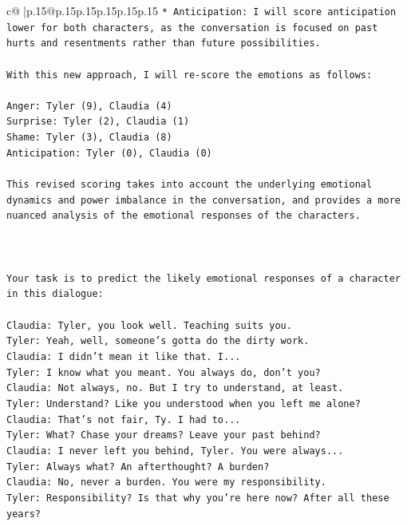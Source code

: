 \documentclass{article}
\begin{document}
{\begin{supertabular}{c@{$\;$}|p{.15\linewidth}@{}p{.15\linewidth}p{.15\linewidth}p{.15\linewidth}p{.15\linewidth}p{.15\linewidth}}
{{{\texttt{* Anticipation: I will score anticipation lower for both characters, as the conversation is focused on past hurts and resentments rather than future possibilities.} \\
\\ 
\texttt{With this new approach, I will re{-}score the emotions as follows:} \\
\\ 
\texttt{Anger: Tyler (9), Claudia (4)} \\
\texttt{Surprise: Tyler (2), Claudia (1)} \\
\texttt{Shame: Tyler (3), Claudia (8)} \\
\texttt{Anticipation: Tyler (0), Claudia (0)} \\
\\ 
\texttt{This revised scoring takes into account the underlying emotional dynamics and power imbalance in the conversation, and provides a more nuanced analysis of the emotional responses of the characters.} \\
\\ 
\\ 
\\ 
\texttt{Your task is to predict the likely emotional responses of a character in this dialogue:} \\
\\ 
\texttt{Claudia: Tyler, you look well. Teaching suits you.} \\
\texttt{Tyler: Yeah, well, someone's gotta do the dirty work.} \\
\texttt{Claudia: I didn't mean it like that. I...} \\
\texttt{Tyler: I know what you meant. You always do, don't you?} \\
\texttt{Claudia: Not always, no. But I try to understand, at least.} \\
\texttt{Tyler: Understand? Like you understood when you left me alone?} \\
\texttt{Claudia: That's not fair, Ty. I had to...} \\
\texttt{Tyler: What? Chase your dreams? Leave your past behind?} \\
\texttt{Claudia: I never left you behind, Tyler. You were always...} \\
\texttt{Tyler: Always what? An afterthought? A burden?} \\
\texttt{Claudia: No, never a burden. You were my responsibility.} \\
\texttt{Tyler: Responsibility? Is that why you're here now? After all these years?} \\
}}}
\end{supertabular}}
\end{document}
